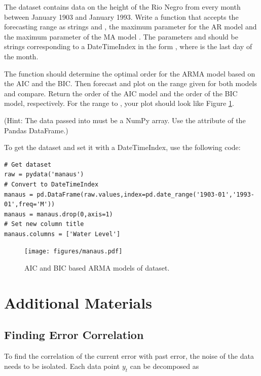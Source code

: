 \begin{problem}
The dataset  contains data on the height of the Rio Negro from every month between January 1903 and January 1993.
Write a function  that accepts the forecasting range as strings  and , the maximum parameter for the AR model  and the maximum parameter of the MA model .
The parameters  and  should be strings corresponding to a DateTimeIndex in the form , where  is the last day of the month.

The function should determine the optimal order for the ARMA model based on the AIC and the BIC.
Then forecast and plot on the range given for both models and compare.
Return the order of the AIC model and the order of the BIC model, respectively.
For the range  to , your plot should look like Figure \ref{fig:manaus}.

(Hint: The data passed into  must be a NumPy array. Use the attribute  of the Pandas DataFrame.)

To get the  dataset and set it with a DateTimeIndex, use the following code:
\begin{lstlisting}
# Get dataset
raw = pydata('manaus')
# Convert to DateTimeIndex
manaus = pd.DataFrame(raw.values,index=pd.date_range('1903-01','1993-01',freq='M'))
manaus = manaus.drop(0,axis=1)
# Set new column title
manaus.columns = ['Water Level']
\end{lstlisting}
\label{prob:manaus}
\end{problem}

\begin{figure}[H]
\centering
\texttt{[image: figures/manaus.pdf]}
\caption{AIC and BIC based ARMA models of  dataset.}
\label{fig:manaus}
\end{figure}


\pagebreak

\section*{Additional Materials}

\subsection*{Finding Error Correlation}
To find the correlation of the current error with past error, the noise of the data needs to be isolated.
Each data point $y_t$ can be decomposed as

